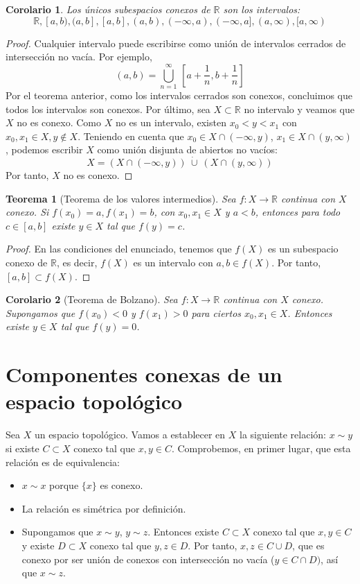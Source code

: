 \documentclass[12pt]{report}
\newtheorem{corollary}{Corolario}[chapter]
\newtheorem{theorem}{Teorema}[chapter]
\theoremstyle{definition}
\theoremstyle{definition}
\theoremstyle{remark}
\newcommand{\R}{\mathbb R}
\begin{document}
\begin{corollary}
Los únicos subespacios conexos de $\R$ son los intervalos: 
\[\R, [a,b), (a,b], [a,b], (a,b), (-\infty,a), (-\infty,a], (a,\infty), [a,\infty)\]
\end{corollary}

\begin{proof}
Cualquier intervalo puede escribirse como unión de intervalos cerrados de intersección no vacía. Por ejemplo, \[(a,b) = \bigcup_{n=1}^{\infty} \, [a+\frac{1}{n},b+\frac{1}{n}]\] Por el teorema anterior, como los intervalos cerrados son conexos, concluimos que todos los intervalos son conexos. Por último, sea $X \subset \R$ no intervalo y veamos que $X$ no es conexo. Como $X$ no es un intervalo, existen $x_0 < y < x_1$ con $x_0,x_1 \in X, y \notin X$. Teniendo en cuenta que $x_0 \in X \cap (-\infty,y)$, $x_1 \in X \cap (y,\infty)$, podemos escribir $X$ como unión disjunta de abiertos no vacíos: \[X = (X \cap (-\infty,y)) \ \dot\cup \ (X \cap (y,\infty))\] Por tanto, $X$ no es conexo.
\end{proof}

\begin{theorem}[Teorema de los valores intermedios]
Sea $f \colon X \to \R$ continua con $X$ conexo. Si $f(x_0) = a, f(x_1) = b$, con $x_0, x_1 \in X$ y $a < b$, entonces para todo $c \in [a,b]$ existe $y \in X$ tal que $f(y) = c$. 
\end{theorem}

\begin{proof}
En las condiciones del enunciado, tenemos que $f(X)$ es un subespacio conexo de $\R$, es decir, $f(X)$ es un intervalo con $a,b \in f(X)$. Por tanto, $[a,b] \subset f(X)$.
\end{proof}

\begin{corollary}[Teorema de Bolzano]
Sea $f \colon X \to \R$ continua con $X$ conexo. Supongamos que $f(x_0) < 0$ y $f(x_1) > 0$ para ciertos $x_0,x_1 \in X$. Entonces existe $y \in X$ tal que $f(y) = 0$.
\end{corollary}

\section{Componentes conexas de un espacio topológico}

Sea $X$ un espacio topológico. Vamos a establecer en $X$ la siguiente relación: $x \sim y$ si existe $C \subset X$ conexo tal que $x,y \in C$. Comprobemos, en primer lugar, que esta relación es de equivalencia:
\begin{itemize}
    \item $x \sim x$ porque $\{x\}$ es conexo.
    \item La relación es simétrica por definición.
    \item Supongamos que $x \sim y$, $y \sim z$. Entonces existe $C \subset X$ conexo tal que $x,y \in C$ y existe $D \subset X$ conexo tal que $y,z \in D$. Por tanto, $x,z \in C \cup D$, que es conexo por ser unión de conexos con intersección no vacía ($y \in C \cap D)$, así que $x \sim z$.
\end{itemize}
\end{document}
